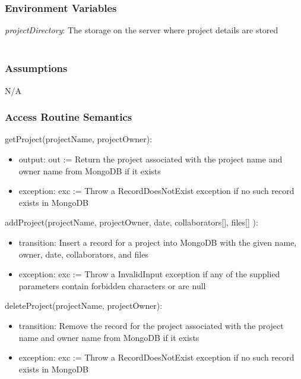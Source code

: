 \documentclass[12pt, titlepage]{article}
\begin{document}
	
	\subsubsection{Environment Variables}
	
	\textit{projectDirectory}: The storage on the server where project details are stored \\\\ 
	
	\subsubsection{Assumptions}
	N/A
	
	\subsubsection{Access Routine Semantics}
	
	\noindent getProject(projectName, projectOwner):
	\begin{itemize}
		\item output: out := Return the project associated with the project name and owner name from MongoDB if it exists
		
		\item exception: exc := Throw a RecordDoesNotExist exception if no such record exists in MongoDB
	\end{itemize}
	
	\noindent addProject(projectName, projectOwner, date, collaborators[], files[] ):
	\begin{itemize}
		\item transition: Insert a record for a project into MongoDB with the given name, owner, date, collaborators, and files
		
		\item exception: exc := Throw a InvalidInput exception if any of the supplied parameters contain forbidden characters or are null
	\end{itemize}
	
	\noindent deleteProject(projectName, projectOwner):
	\begin{itemize}
		\item transition: Remove the record for the project associated with the project name and owner name from MongoDB if it exists
		
		\item exception: exc := Throw a RecordDoesNotExist exception if no such record exists in MongoDB
	\end{itemize}
	
\end{document}
